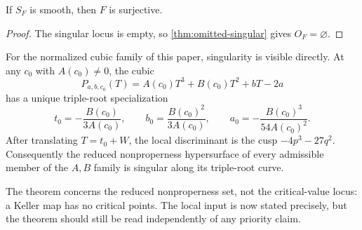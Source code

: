 \begin{corollary}
\label{cor:smooth-nonproper-surjective}
If \(S_F\) is smooth, then \(F\) is surjective.
\end{corollary}

\begin{proof}
The singular locus is empty, so \cref{thm:omitted-singular} gives
\(O_F=\varnothing\).
\end{proof}

For the normalized cubic family of this paper, singularity is visible
directly.  At any \(c_0\) with \(A(c_0)\ne0\), the cubic
\[
P_{a,b,c_0}(T)=A(c_0)T^3+B(c_0)T^2+bT-2a
\]
has a unique triple-root specialization
\[
t_0=-\frac{B(c_0)}{3A(c_0)},\qquad
b_0=\frac{B(c_0)^2}{3A(c_0)},\qquad
a_0=-\frac{B(c_0)^3}{54A(c_0)^2}.
\]
After translating \(T=t_0+W\), the local discriminant is the cusp
\(-4p^3-27q^2\).  Consequently the reduced nonproperness hypersurface of
every admissible member of the \(A,B\) family is singular along its
triple-root curve.

\begin{remark}[Scope]
The theorem concerns the reduced nonproperness set, not the critical-value
locus: a Keller map has no critical points.  The local input is now stated
precisely, but the theorem should still be read independently of any priority
claim.
\end{remark}
